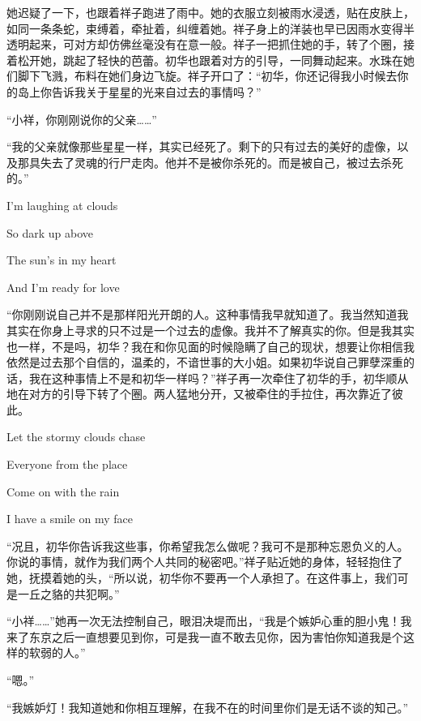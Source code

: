 \documentclass{article}
\begin{document}
她迟疑了一下，也跟着祥子跑进了雨中。她的衣服立刻被雨水浸透，贴在皮肤上，如同一条条蛇，束缚着，牵扯着，纠缠着她。祥子身上的洋装也早已因雨水变得半透明起来，可对方却仿佛丝毫没有在意一般。祥子一把抓住她的手，转了个圈，接着松开她，跳起了轻快的芭蕾。初华也跟着对方的引导，一同舞动起来。水珠在她们脚下飞溅，布料在她们身边飞旋。祥子开口了：“初华，你还记得我小时候去你的岛上你告诉我关于星星的光来自过去的事情吗？”



“小祥，你刚刚说你的父亲……”



“我的父亲就像那些星星一样，其实已经死了。剩下的只有过去的美好的虚像，以及那具失去了灵魂的行尸走肉。他并不是被你杀死的。而是被自己，被过去杀死的。”



I'm laughing at clouds

So dark up above

The sun's in my heart

And I'm ready for love



“你刚刚说自己并不是那样阳光开朗的人。这种事情我早就知道了。我当然知道我其实在你身上寻求的只不过是一个过去的虚像。我并不了解真实的你。但是我其实也一样，不是吗，初华？我在和你见面的时候隐瞒了自己的现状，想要让你相信我依然是过去那个自信的，温柔的，不谙世事的大小姐。如果初华说自己罪孽深重的话，我在这种事情上不是和初华一样吗？”祥子再一次牵住了初华的手，初华顺从地在对方的引导下转了个圈。两人猛地分开，又被牵住的手拉住，再次靠近了彼此。



Let the stormy clouds chase

Everyone from the place

Come on with the rain

I have a smile on my face



“况且，初华你告诉我这些事，你希望我怎么做呢？我可不是那种忘恩负义的人。你说的事情，就作为我们两个人共同的秘密吧。”祥子贴近她的身体，轻轻抱住了她，抚摸着她的头，“所以说，初华你不要再一个人承担了。在这件事上，我们可是一丘之貉的共犯啊。”



“小祥……”她再一次无法控制自己，眼泪决堤而出，“我是个嫉妒心重的胆小鬼！我来了东京之后一直想要见到你，可是我一直不敢去见你，因为害怕你知道我是个这样的软弱的人。”



“嗯。”



“我嫉妒灯！我知道她和你相互理解，在我不在的时间里你们是无话不谈的知己。”
\end{document}

